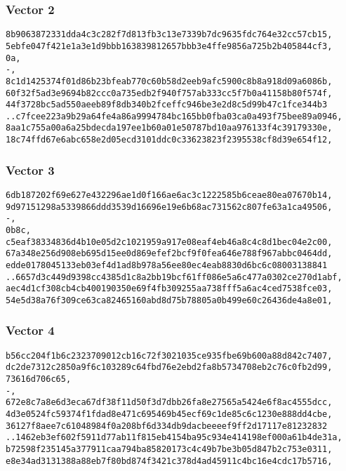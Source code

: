 \documentclass[
]{article}
\begin{document}
\subsubsection{Vector 2}\label{vector-2}

\begin{verbatim}
8b9063872331dda4c3c282f7d813fb3c13e7339b7dc9635fdc764e32cc57cb15,
5ebfe047f421e1a3e1d9bbb163839812657bbb3e4ffe9856a725b2b405844cf3,
0a,
-,
8c1d1425374f01d86b23bfeab770c60b58d2eeb9afc5900c8b8a918d09a6086b,
60f32f5ad3e9694b82ccc0a735edb2f940f757ab333cc5f7b0a41158b80f574f,
44f3728bc5ad550aeeb89f8db340b2fceffc946be3e2d8c5d99b47c1fce344b3
..c7fcee223a9b29a64fe4a86a9994784bc165bb0fba03ca0a493f75bee89a0946,
8aa1c755a00a6a25bdecda197ee1b60a01e50787bd10aa976133f4c39179330e,
18c74ffd67e6abc658e2d05ecd3101ddc0c33623823f2395538cf8d39e654f12,
\end{verbatim}

\subsubsection{Vector 3}\label{vector-3}

\begin{verbatim}
6db187202f69e627e432296ae1d0f166ae6ac3c1222585b6ceae80ea07670b14,
9d97151298a5339866ddd3539d16696e19e6b68ac731562c807fe63a1ca49506,
-,
0b8c,
c5eaf38334836d4b10e05d2c1021959a917e08eaf4eb46a8c4c8d1bec04e2c00,
67a348e256d908eb695d15ee0d869efef2bcf9f0fea646e788f967abbc0464dd,
edde0178045133eb03ef4d1ad8b978a56ee80ec4eab8830d6bc6c08003138841
..6657d3c449d9398cc4385d1c8a2bb19bcf61ff086e5a6c477a0302ce270d1abf,
aec4d1cf308cb4cb400190350e69f4fb309255aa738fff5a6ac4ced7538fce03,
54e5d38a76f309ce63ca82465160abd8d75b78805a0b499e60c26436de4a8e01,
\end{verbatim}

\subsubsection{Vector 4}\label{vector-4}

\begin{verbatim}
b56cc204f1b6c2323709012cb16c72f3021035ce935fbe69b600a88d842c7407,
dc2de7312c2850a9f6c103289c64fbd76e2ebd2fa8b5734708eb2c76c0fb2d99,
73616d706c65,
-,
672e8c7a8e6d3eca67df38f11d50f3d7dbb26fa8e27565a5424e6f8ac4555dcc,
4d3e0524fc59374f1fdad8e471c695469b45ecf69c1de85c6c1230e888dd4cbe,
36127f8aee7c61048984f0a208bf6d334db9dacbeeeef9ff2d17117e81232832
..1462eb3ef602f5911d77ab11f815eb4154ba95c934e414198ef000a61b4de31a,
b72598f235145a377911caa794ba85820173c4c49b7be3b05d847b2c753e0311,
e8e34ad3131388a88eb7f80bd874f3421c378d4ad45911c4bc16e4cdc17b5716,
\end{verbatim}
\end{document}
